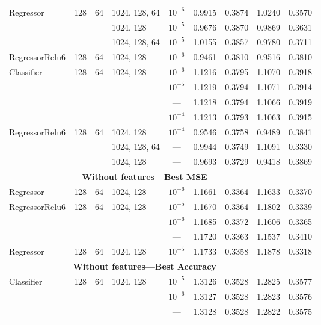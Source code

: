\begin{table}
\begin{tabular}{lcclccccc}
Regressor & 128 & 64 & 1024, 128, 64 & $10^{-6}$   &  0.9915 &      0.3874 &   1.0240 &        0.3570 \\
           &     &    & 1024, 128 & $10^{-5}$   &  0.9676 &      0.3870 &   0.9869 &        0.3631 \\
           &     &    & 1024, 128, 64 & $10^{-5}$   &  1.0155 &      0.3857 &   0.9780 &        0.3711 \\
RegressorRelu6 & 128 & 64 & 1024, 128 & $10^{-6}$   &  0.9461 &      0.3810 &   0.9516 &        0.3810 \\
Classifier & 128 & 64 & 1024, 128 & $10^{-6}$   &  1.1216 &      0.3795 &   1.1070 &        0.3918 \\
           &     &    &                                 & $10^{-5}$   &  1.1219 &      0.3794 &   1.1071 &        0.3914 \\
           &     &    &                                 & ---   &  1.1218 &      0.3794 &   1.1066 &        0.3919 \\
           &     &    &                                 & $10^{-4}$   &  1.1213 &      0.3793 &   1.1063 &        0.3915 \\
RegressorRelu6 & 128 & 64 & 1024, 128 & $10^{-4}$   &  0.9546 &      0.3758 &   0.9489 &        0.3841 \\
           &     &    & 1024, 128, 64 & ---   &  0.9944 &      0.3749 &   1.1091 &        0.3330 \\
           &     &    & 1024, 128 & ---   &  0.9693 &      0.3729 &   0.9418 &        0.3869 \\
\midrule
\multicolumn{8}{c}{\textbf{Without features---Best MSE}}\\\addlinespace
Regressor & 128 & 64 & 1024, 128 & $10^{-6}$  &  1.1661 &      0.3364 &   1.1633 &        0.3370 \\
RegressorRelu6 & 128 & 64 & 1024, 128 & $10^{-5}$  &  1.1670 &      0.3364 &   1.1802 &        0.3339 \\
           &     &    &                                 & $10^{-6}$  &  1.1685 &      0.3372 &   1.1606 &        0.3365 \\
           &     &    &                                 & ---  &  1.1720 &      0.3363 &   1.1537 &        0.3410 \\
Regressor & 128 & 64 & 1024, 128 & $10^{-5}$  &  1.1733 &      0.3358 &   1.1878 &        0.3318 \\
\midrule
\multicolumn{8}{c}{\textbf{Without features---Best Accuracy}}\\\addlinespace
Classifier & 128 & 64 & 1024, 128 & $10^{-5}$  &  1.3126 &      0.3528 &   1.2825 &        0.3577 \\
           &     &    &                                 & $10^{-6}$  &  1.3127 &      0.3528 &   1.2823 &        0.3576 \\
           &     &    &                                 & ---  &  1.3128 &      0.3528 &   1.2822 &        0.3575 \\
           

\end{tabular}
\end{table}

